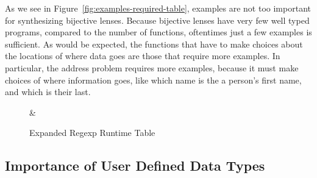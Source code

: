 As we see in Figure~\ref{fig:examples-required-table}, examples are not too
important for synthesizing bijective lenses.
Because bijective lenses have very few well typed programs, compared to the
number of functions, oftentimes just a few examples is sufficient.
As would be expected, the functions that have to make choices about the
locations of where data goes are those that require more examples.
In particular, the address problem requires more examples, because it must make
choices of where information goes, like which name is the a person's first name,
and which is their last.

\begin{figure}
\centering

%
{\Test{} & \ForceExpandTime{}}%

\caption{Expanded Regexp Runtime Table}
\label{fig:expanded-time-table}
\end{figure}
\subsection{Importance of User Defined Data Types}

